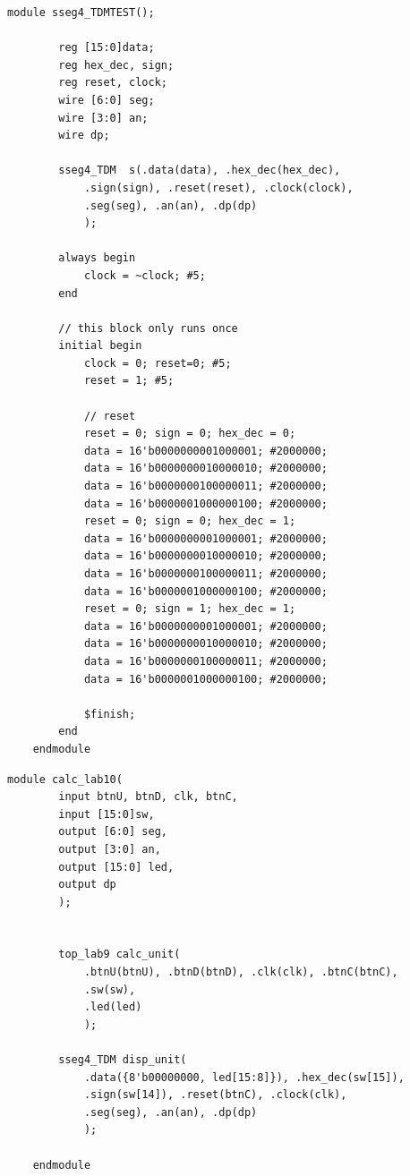 \documentclass[11pt]{article}
\begin{document}
\begin{lstlisting}[style=Verilog,
caption=Sseg4TDM Test,
label=MUX4 Test
]
	module sseg4_TDMTEST();
	
		reg [15:0]data;
		reg hex_dec, sign;
		reg reset, clock;
		wire [6:0] seg;
		wire [3:0] an;
		wire dp;
		
		sseg4_TDM  s(.data(data), .hex_dec(hex_dec),
			.sign(sign), .reset(reset), .clock(clock),
			.seg(seg), .an(an), .dp(dp)
			);
		
		always begin 
			clock = ~clock; #5; 
		end
		
		// this block only runs once
		initial begin
			clock = 0; reset=0; #5;
			reset = 1; #5;
		
			// reset
			reset = 0; sign = 0; hex_dec = 0; 
			data = 16'b0000000001000001; #2000000;
			data = 16'b0000000010000010; #2000000;
			data = 16'b0000000100000011; #2000000;
			data = 16'b0000001000000100; #2000000;
			reset = 0; sign = 0; hex_dec = 1; 
			data = 16'b0000000001000001; #2000000;
			data = 16'b0000000010000010; #2000000;
			data = 16'b0000000100000011; #2000000;
			data = 16'b0000001000000100; #2000000;
			reset = 0; sign = 1; hex_dec = 1; 
			data = 16'b0000000001000001; #2000000;
			data = 16'b0000000010000010; #2000000;
			data = 16'b0000000100000011; #2000000;
			data = 16'b0000001000000100; #2000000;
			
			$finish;
		end 
	endmodule
\end{lstlisting}
\clearpage
\begin{lstlisting}[style=Verilog,
caption=CalcLab10,
label=MUX2 Test
]
	module calc_lab10(
		input btnU, btnD, clk, btnC,
		input [15:0]sw,
		output [6:0] seg,
		output [3:0] an,
		output [15:0] led,
		output dp
		);
	
	
		top_lab9 calc_unit(
			.btnU(btnU), .btnD(btnD), .clk(clk), .btnC(btnC),
			.sw(sw),
			.led(led)
			);
		
		sseg4_TDM disp_unit(
			.data({8'b00000000, led[15:8]}), .hex_dec(sw[15]),
			.sign(sw[14]), .reset(btnC), .clock(clk),
			.seg(seg), .an(an), .dp(dp)
			);
	
	endmodule
\end{lstlisting}
\end{document}
